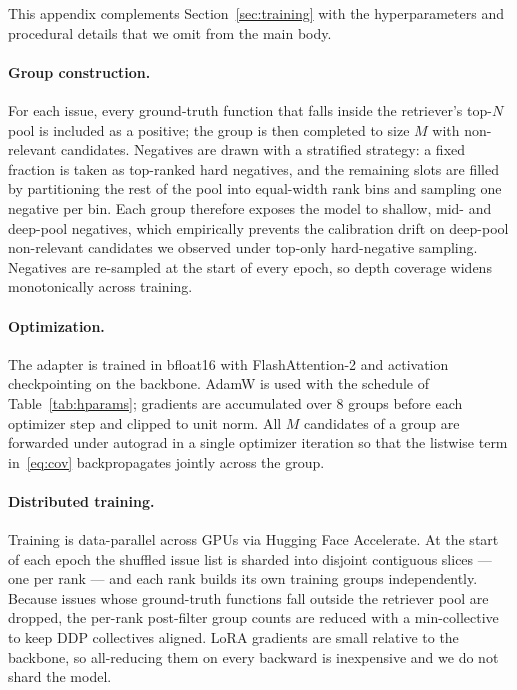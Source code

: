 This appendix complements Section~\ref{sec:training} with the
hyperparameters and procedural details that we omit from the main
body.

\paragraph{Group construction.}
For each issue, every ground-truth function that falls inside the
retriever's top-$N$ pool is included as a positive; the group is
then completed to size $M$ with non-relevant candidates. Negatives
are drawn with a stratified strategy: a fixed fraction is taken as
top-ranked hard negatives, and the remaining slots are filled by
partitioning the rest of the pool into equal-width rank bins and
sampling one negative per bin. Each group therefore exposes the
model to shallow, mid- and deep-pool negatives, which empirically
prevents the calibration drift on deep-pool non-relevant candidates
we observed under top-only hard-negative sampling. Negatives are
re-sampled at the start of every epoch, so depth coverage widens
monotonically across training.

\paragraph{Optimization.}
The adapter is trained in bfloat16 with FlashAttention-2 and
activation checkpointing on the backbone. AdamW is used with the
schedule of Table~\ref{tab:hparams}; gradients are accumulated over
$8$ groups before each optimizer step and clipped to unit norm. All
$M$ candidates of a group are forwarded under autograd in a single
optimizer iteration so that the listwise term in~\eqref{eq:cov}
backpropagates jointly across the group.

\paragraph{Distributed training.}
Training is data-parallel across GPUs via Hugging Face Accelerate.
At the start of each epoch the shuffled issue list is sharded into
disjoint contiguous slices --- one per rank --- and each rank
builds its own training groups independently. Because issues whose
ground-truth functions fall outside the retriever pool are dropped,
the per-rank post-filter group counts are reduced with a
min-collective to keep DDP collectives aligned. LoRA gradients are
small relative to the backbone, so all-reducing them on every
backward is inexpensive and we do not shard the model.

